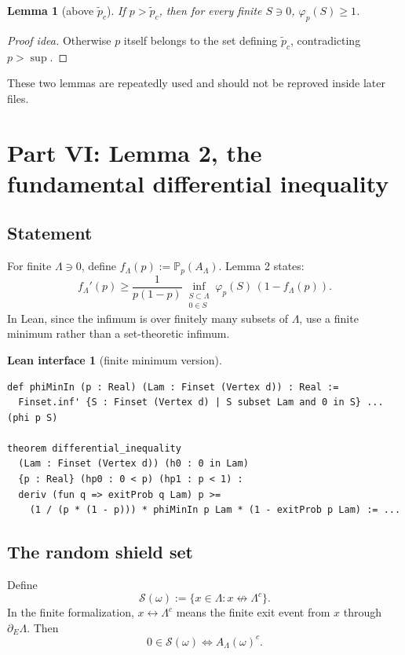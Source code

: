 \documentclass[11pt]{article}
\newcommand{\PP}{\mathbb P}
\newcommand{\conn}{\longleftrightarrow}
\newcommand{\ptilde}{\widetilde p_c}
\newcommand{\Lam}{\Lambda}
\newcommand{\dE}{\partial_E}
\theoremstyle{definition}
\newtheorem{interface}[definition]{Lean interface}
\theoremstyle{plain}
\newtheorem{lemma}[definition]{Lemma}
\begin{document}
\begin{lemma}[above $\ptilde$]
If $p>\ptilde$, then for every finite $S\ni0$, $\varphi_p(S)\ge1$.
\end{lemma}
\begin{proof}[Proof idea]
Otherwise $p$ itself belongs to the set defining $\ptilde$, contradicting $p>\sup$.
\end{proof}

These two lemmas are repeatedly used and should not be reproved inside later files.

\section{Part VI: Lemma 2, the fundamental differential inequality}

\subsection{Statement}

For finite $\Lam\ni0$, define $f_\Lam(p):=\PP_p(A_\Lam)$.  Lemma 2 states:
\[
  f_\Lam'(p)
  \ge
  \frac{1}{p(1-p)}
  \inf_{\substack{S\subset\Lam\\0\in S}}
  \varphi_p(S)\,(1-f_\Lam(p)).
\]
In Lean, since the infimum is over finitely many subsets of $\Lam$, use a finite minimum rather than a set-theoretic infimum.

\begin{interface}[finite minimum version]
\begin{lstlisting}
def phiMinIn (p : Real) (Lam : Finset (Vertex d)) : Real :=
  Finset.inf' {S : Finset (Vertex d) | S subset Lam and 0 in S} ... (phi p S)

theorem differential_inequality
  (Lam : Finset (Vertex d)) (h0 : 0 in Lam)
  {p : Real} (hp0 : 0 < p) (hp1 : p < 1) :
  deriv (fun q => exitProb q Lam) p >=
    (1 / (p * (1 - p))) * phiMinIn p Lam * (1 - exitProb p Lam) := ...
\end{lstlisting}
\end{interface}

\subsection{The random shield set}

Define
\[
  \mathcal S(\omega):=
  \{x\in\Lam : x\not\conn\Lam^c\}.
\]
In the finite formalization, $x\conn\Lam^c$ means the finite exit event from $x$ through $\dE\Lam$.
Then
\[
  0\in\mathcal S(\omega) \iff A_\Lam(\omega)^c.
\]
\end{document}
